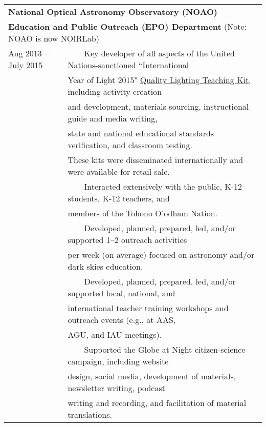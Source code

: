 \documentclass[11pt]{article}
\makeatletter
\newcommand{\tabitem}{~~\llap{\textbullet}~~}
\def\vhrulefill#1{\leavevmode\leaders\hrule\@height#1\hfill \kern\z@}
\makeatother
\begin{document}
\begin{longtable}{p{} p{}}
\multicolumn{2}{l}{\bf  National Optical Astronomy Observatory (NOAO)}\vhrulefill{0.5pt}\\
\multicolumn{2}{l}{{\bf  Education and Public Outreach (EPO) Department} \footnotesize{(Note: NOAO is now NOIRLab)}}\smallskip\\
Aug 2013 --  July 2015 & \tabitem Key developer of all aspects of the United Nations-sanctioned ``International\\
& \hspace{13pt}Year of Light 2015" \href{https://noirlab.edu/public/products/education/edu001/}{Quality Lighting Teaching Kit}, including activity creation\\
& \hspace{13pt}and development, materials sourcing, instructional guide and media writing,\\
& \hspace{13pt}state and national educational standards verification, and classroom testing.\\
& \hspace{13pt}These kits were disseminated internationally and were available for retail sale.\\
& \tabitem Interacted extensively with the public, K-12 students, K-12 teachers, and\\
& \hspace{13pt}members of the Tohono O'odham Nation. \\
& \tabitem Developed, planned, prepared, led, and/or supported 1--2 outreach activities\\
& \hspace{13pt}per week (on average) focused on astronomy and/or dark skies education. \\
& \tabitem Developed, planned, prepared, led, and/or supported local, national, and\\
& \hspace{13pt}international teacher training workshops and outreach events (e.g., at AAS,\\
& \hspace{13pt}AGU, and IAU meetings). \\
&  \tabitem Supported the Globe at Night citizen-science campaign, including website\\
& \hspace{13pt}design, social media, development of materials, newsletter writing, podcast\\
& \hspace{13pt}writing and recording, and facilitation of material translations. \\

\end{longtable}
\end{document}
